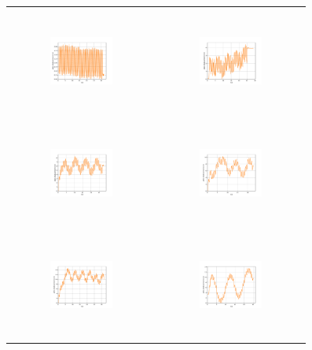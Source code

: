 \begin{figure}[H]
\begin{center}
\begin{tabular}{cc}
\includegraphics[width=0.45\textwidth, height=3.5cm]{graph/omega=3.50_A=1_plate.pdf}
&
\includegraphics[width=0.45\textwidth, height=3.5cm]{graph/omega=3.50_A=2_plate.pdf}\\
\includegraphics[width=0.45\textwidth, height=3.5cm]{graph/omega=3.50_A=3_plate.pdf}
&
\includegraphics[width=0.45\textwidth, height=3.5cm]{graph/omega=3.50_A=4_plate.pdf}\\
\includegraphics[width=0.45\textwidth, height=3.5cm]{graph/omega=3.50_A=5_plate.pdf}
&
\includegraphics[width=0.45\textwidth, height=3.5cm]{graph/omega=3.50_A=6_plate.pdf}\\

\end{tabular}
\end{center}
\end{figure}
